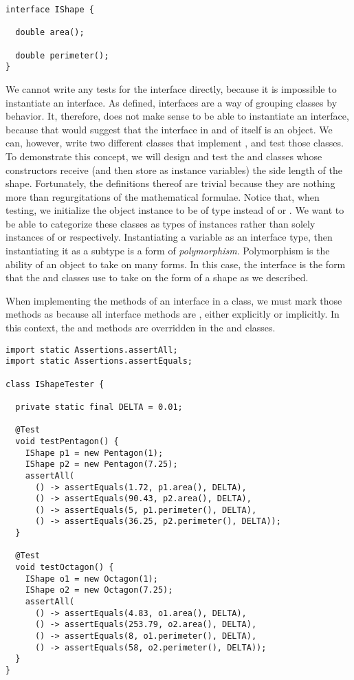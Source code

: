\begin{lstlisting}[language=MyJava]
interface IShape {

  double area();

  double perimeter();
}
\end{lstlisting}

We cannot write any tests for the  interface directly, because it is impossible to instantiate an interface. 
As defined, interfaces are a way of grouping classes by behavior. 
It, therefore, does not make sense to be able to instantiate an interface, because that would suggest that the interface in and of itself is an object.
We can, however, write two different classes that implement , and test those classes. 
To demonstrate this concept, we will design and test the  and  classes whose constructors receive (and then store as instance variables) the side length of the shape. 
Fortunately, the definitions thereof are trivial because they are nothing more than regurgitations of the mathematical formulae. 
Notice that, when testing, we initialize the object instance to be of type  instead of  or . 
We want to be able to categorize these classes as types of  instances rather than solely instances of  or  respectively. 
Instantiating a variable as an interface type, then instantiating it as a subtype is a form of \emph{polymorphism}. 
Polymorphism is the ability of an object to take on many forms. 
In this case, the  interface is the form that the  and  classes use to take on the form of a shape as we described. 

When implementing the methods of an interface in a class, we must mark those methods as  because all interface methods are , either explicitly or implicitly. 
In this context, the  and  methods are overridden in the  and  classes.

\enlargethispage{-2\baselineskip}
\begin{lstlisting}[language=MyJava]
import static Assertions.assertAll;
import static Assertions.assertEquals;

class IShapeTester {

  private static final DELTA = 0.01;
  
  @Test
  void testPentagon() {
    IShape p1 = new Pentagon(1);
    IShape p2 = new Pentagon(7.25);
    assertAll(
      () -> assertEquals(1.72, p1.area(), DELTA),
      () -> assertEquals(90.43, p2.area(), DELTA),
      () -> assertEquals(5, p1.perimeter(), DELTA),
      () -> assertEquals(36.25, p2.perimeter(), DELTA));
  }

  @Test
  void testOctagon() {
    IShape o1 = new Octagon(1);
    IShape o2 = new Octagon(7.25);
    assertAll(
      () -> assertEquals(4.83, o1.area(), DELTA),
      () -> assertEquals(253.79, o2.area(), DELTA),
      () -> assertEquals(8, o1.perimeter(), DELTA),
      () -> assertEquals(58, o2.perimeter(), DELTA));
  }
}
\end{lstlisting}

